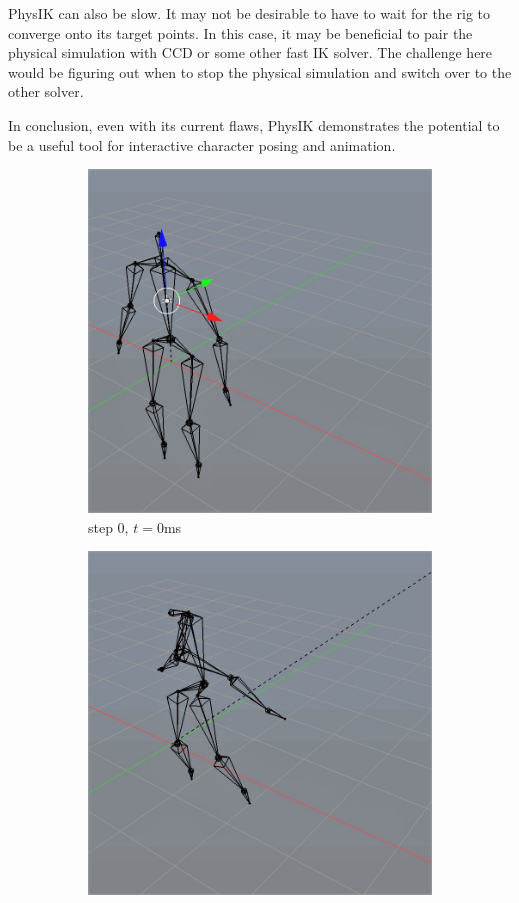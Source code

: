 \documentclass[10pt,twocolumn,letterpaper]{article}
\begin{document}
PhysIK can also be slow. It may not be desirable to have to wait for the rig to converge onto its target points. In this case, it may be beneficial to pair the physical simulation with CCD or some other fast IK solver. The challenge here would be figuring out when to stop the physical simulation and switch over to the other solver.

In conclusion, even with its current flaws, PhysIK demonstrates the potential to be a useful tool for interactive character posing and animation.




\begin{figure}[]
    \centering
    \begin{subfigure}{0.2\textwidth}
        \centering
        \includegraphics[width=.9\linewidth]{linear-cannon-0.jpg}
        \caption{step 0, $t=0$ms}
    \end{subfigure}\begin{subfigure}{0.2\textwidth}
        \centering
        \includegraphics[width=.9\linewidth]{linear-cannon-5.jpg}

\end{subfigure}
\end{figure}
\end{document}
